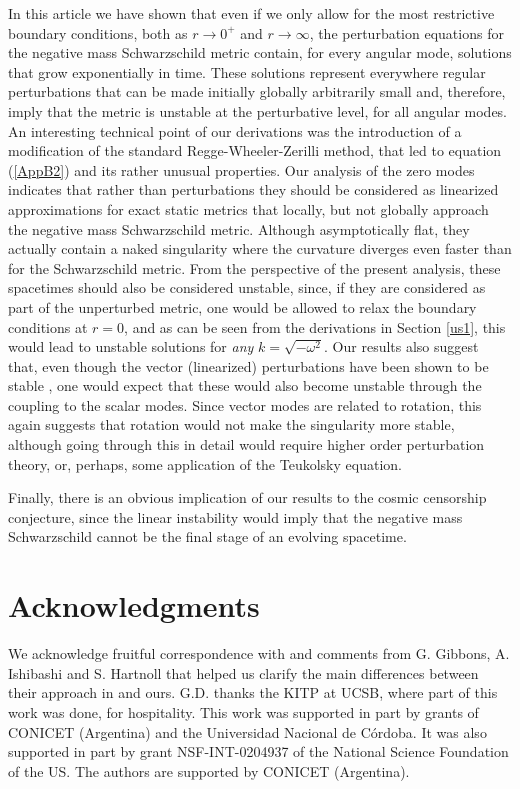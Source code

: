 \documentclass[12pt,aps,floats,showpacs,amssymb,tightenlines]{revtex4}
\newcommand{\s}{ Schwarzschild }
\begin{document}
In this article we have shown that even if we only allow for the
 most restrictive boundary conditions, both as $r \to 0^+ $ and $r \to \infty$, the
 perturbation equations for the negative mass Schwarzschild metric contain,
 for every angular mode, solutions that grow exponentially in time.
 These solutions represent everywhere regular perturbations that can be
 made initially globally arbitrarily small and, therefore, imply that
 the metric is unstable at the perturbative level, for all angular modes.
 An interesting technical point of our derivations was the introduction of
a modification of the standard Regge-Wheeler-Zerilli method, that led to equation
 (\ref{AppB2}) and its rather unusual properties.
Our analysis of the zero modes indicates that rather than
perturbations they should be considered as linearized approximations
for exact static metrics that locally, but not globally approach the
negative mass Schwarzschild metric. Although asymptotically flat,
they actually contain a naked singularity where the curvature
diverges even faster than for the Schwarzschild metric. From the
perspective of the present analysis, these spacetimes should also be considered
unstable, since, if they are considered as part of the unperturbed
metric, one would be allowed to relax the boundary conditions at
$r=0$, and as can be seen from the derivations in Section \ref{us1}, this
would lead to unstable solutions for {\em any} $k = \sqrt{-\omega^2} $. Our
results also suggest that, even though the vector (linearized)
perturbations have been shown to be stable \cite{ghi}, one would
expect that these would also become unstable through the coupling to
the scalar modes. Since vector modes are related to rotation, this
again suggests that rotation would not make the singularity more
stable, although going through this in detail would require higher
order perturbation theory, or, perhaps, some application of the
Teukolsky equation.

Finally, there is an obvious implication of our results to the
cosmic censorship conjecture, since the linear instability would imply
that the negative mass \s cannot be the final stage of
an evolving spacetime.




\section*{Acknowledgments}
We acknowledge fruitful correspondence with and comments  from G.
Gibbons, A. Ishibashi and S. Hartnoll that helped us clarify the
main differences between their approach in \cite{ghi} and ours.
 G.D. thanks the KITP at UCSB, where part of this work was done,
 for  hospitality.
This work was supported in part by grants of CONICET (Argentina) and
the Universidad Nacional de   C\'ordoba. It was also supported in
part by grant NSF-INT-0204937 of the National Science Foundation of
the US. The authors are supported by CONICET (Argentina).
\end{document}
